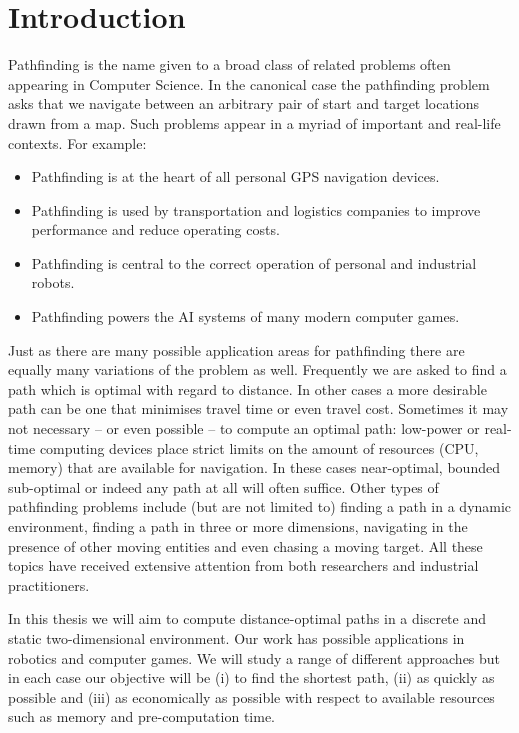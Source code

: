 \chapter{Introduction}
\label{cha::intro}

Pathfinding is the name given to a broad class of related problems often
appearing in Computer Science. In the canonical case the pathfinding problem
asks that we navigate between an arbitrary pair of start and target locations
drawn from a map. Such problems appear in a myriad of important and real-life
contexts. For example:
\begin{itemize}
\item Pathfinding is at the heart of all personal GPS navigation devices.
\item Pathfinding is used by transportation and logistics companies to 
improve performance and reduce operating costs.
\item Pathfinding is central to the correct operation of personal and
industrial robots.
\item Pathfinding powers the AI systems of many modern computer games.
\end{itemize}

\noindent Just as there are many possible application areas for pathfinding
there are equally many variations of the problem as well. Frequently we are
asked to find a path which is optimal with regard to distance. In other cases
a more desirable path can be one that minimises travel time or even travel
cost.  Sometimes it may not necessary -- or even possible -- to compute an
optimal path: low-power or real-time computing devices place strict limits on
the amount of resources (CPU, memory) that are available for navigation.  In
these cases near-optimal, bounded sub-optimal or indeed any path at all will
often suffice. Other types of pathfinding problems include (but are not
limited to) finding a path in a dynamic environment, finding a path in three
or more dimensions, navigating in the presence of other moving entities and
even chasing a moving target. All these topics have received extensive
attention from both researchers and industrial practitioners.

In this thesis we will aim to compute distance-optimal paths in a discrete and
static two-dimensional environment. Our work has possible applications in
robotics and computer games.  We will study a range of different approaches
but in each case our objective will be (i) to find the shortest path, (ii) as
quickly as possible and (iii) as economically as possible with respect to
available resources such as memory and pre-computation time.

